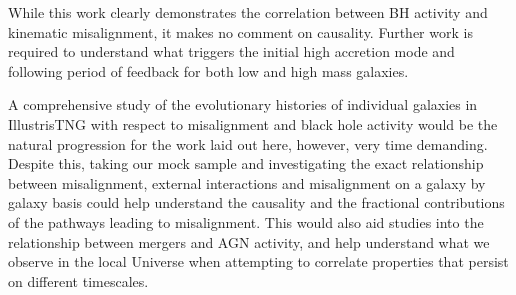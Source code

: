 While this work clearly demonstrates the correlation between BH activity and kinematic misalignment, it makes no comment on causality. Further work is required to understand what triggers the initial high accretion mode and following period of feedback for both low and high mass galaxies.

A comprehensive study of the evolutionary histories of individual galaxies in IllustrisTNG with respect to misalignment and black hole activity would be the natural progression for the work laid out here, however, very time demanding. Despite this, taking our mock sample and investigating the exact relationship between misalignment, external interactions and misalignment on a galaxy by galaxy basis could help understand the causality and the fractional contributions of the pathways leading to misalignment. This would also aid studies into the relationship between mergers and AGN activity, and help understand what we observe in the local Universe when attempting to correlate properties that persist on different timescales.
